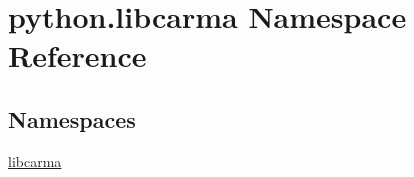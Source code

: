 \hypertarget{namespacepython_1_1libcarma}{\section{python.\-libcarma Namespace Reference}
\label{namespacepython_1_1libcarma}
}
\subsection*{Namespaces}
\begin{DoxyCompactItemize}
\item 
\hyperlink{namespacepython_1_1libcarma_1_1libcarma}{libcarma}
\end{DoxyCompactItemize}
